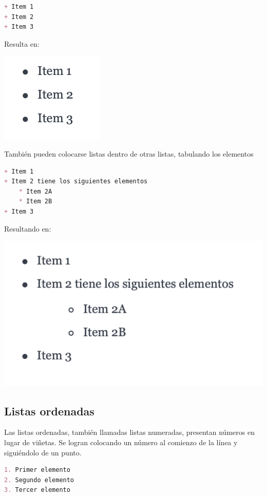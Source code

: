 \begin{lstlisting}[language=Markdown,otherkeywords={+},morekeywords={[2]{+}}]
+ Item 1
+ Item 2
+ Item 3
\end{lstlisting}

Resulta en:

\includegraphics[]{anexos/markdown/imagenes/md_ulist_1.png}

También pueden colocarse listas dentro de otras listas, tabulando los
elementos

\begin{lstlisting}[language=Markdown,otherkeywords={+},morekeywords={[2]{+}}]
+ Item 1
+ Item 2 tiene los siguientes elementos
    * Item 2A
    * Item 2B
+ Item 3
\end{lstlisting}

Resultando en:

\includegraphics[]{anexos/markdown/imagenes/md_ulist_2.png}

\subsection*{Listas ordenadas}

Las listas ordenadas, también llamadas listas numeradas, presentan números
en lugar de viñetas. Se logran colocando un número al comienzo de la línea
y siguiéndolo de un punto.

\begin{lstlisting}[language=Markdown]
1. Primer elemento
2. Segundo elemento
3. Tercer elemento
\end{lstlisting}

